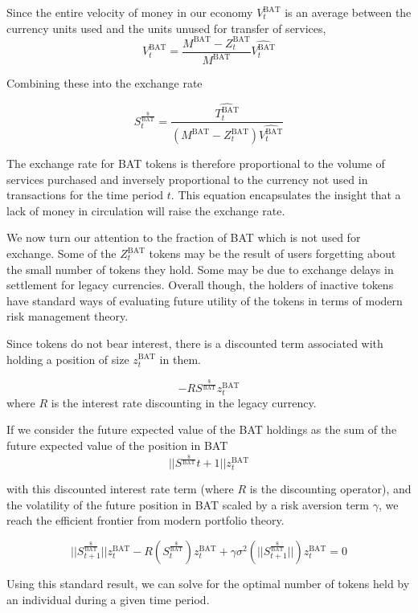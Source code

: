 \documentclass[11pt]{article}
\begin{document}
Since the entire velocity of money in our economy $V^{\textrm{BAT}}_{t}$ is an average
between the currency units used and the units unused for transfer of
services, 
   \[ V^{\textrm{BAT}}_{t} = \frac{M^{\textrm{BAT}}-Z^{\textrm{BAT}}_{t}}{M^{\textrm{BAT}}} \widehat{V^{\textrm{BAT}}_{t}}\] 

Combining these into the exchange rate

\[ \tag{1} S^{\frac{\$}{\textrm{BAT}}}_{t} = \frac{\widehat{T^{\textrm{BAT}}_{t}}}{(M^{\textrm{BAT}} - Z^{\textrm{BAT}}_{t} ) \widehat{V^{\textrm{BAT}}_{t}}} \]

The exchange rate for \textrm{BAT} tokens is therefore proportional to the
volume of services purchased and inversely proportional to the
currency not used in transactions for the time period $t$. This equation
encapsulates the insight that a lack of money in circulation will
raise the exchange rate.

We now turn our attention to the fraction of \textrm{BAT} which is not used for
exchange. Some of the $Z^{\textrm{BAT}}_{t}$ tokens may
be the result of users forgetting about the small number of tokens
they hold. Some may be due to exchange delays in settlement for legacy
currencies. Overall though, the holders of inactive tokens have
standard ways of evaluating future utility of the tokens in terms of
modern risk management theory.

Since tokens do not bear interest, there is a discounted term
associated with holding a position of size  $z^{\textrm{BAT}}_{t}$ in them.

\[ -R S^{\frac{\$}{\textrm{BAT}}} z^{\textrm{BAT}}_{t} \] 
where $R$ is the interest rate discounting in the legacy currency.

If we consider the future expected value of the \textrm{BAT} holdings as the
sum of the future expected value of the position in  \textrm{BAT}
\[ ||S^{\frac{\$}{\textrm{BAT}}}{t+1}|| z^{\textrm{BAT}}_{t}\]

with this discounted interest rate term (where $R$ is the discounting operator),
and the volatility of the future position in \textrm{BAT} scaled by a risk
aversion term $\gamma$, we reach the efficient frontier from modern portfolio
theory.

\[ ||S^{\frac{\$}{\textrm{BAT}}}_{t+1}|| z^{\textrm{BAT}}_{t} -R (S^{\frac{\$}{\textrm{BAT}}}_{t}) z^{\textrm{BAT}}_{t} + \gamma \sigma^{2}(||S^{\frac{\$}{\textrm{BAT}}}_{t+1}||) z^{\textrm{BAT}}_{t} =0\]

Using this standard result, we can solve for the optimal number of
tokens held by an individual during a given time period.
\end{document}
